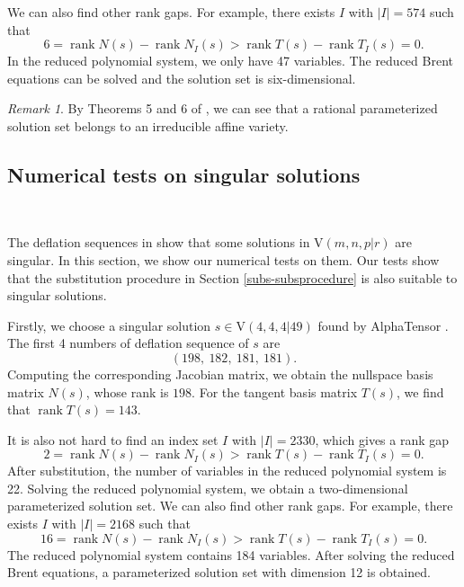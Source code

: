 \documentclass[reqno]{amsart}
\theoremstyle{definition}
\numberwithin{equation}{section}
\theoremstyle{remark}
\newtheorem{remark}[theorem]{Remark}
\begin{document}
We can also find other rank gaps. For example, there exists $I$ with $|I|=574$ such that
\begin{equation*}
 6=\operatorname{rank}N(s)-\operatorname{rank}N_I(s)>\operatorname{rank}T(s)-\operatorname{rank}T_I(s)=0.
\end{equation*}
In the reduced polynomial system, we only have 47 variables. The reduced Brent equations can be solved and the solution set is six-dimensional.

\begin{remark}
By Theorems 5 and 6 of \cite[Chapter 4  \S 5]{cox25}, we can see that a rational parameterized solution set belongs to an irreducible affine variety.
\end{remark}

\subsection{Numerical tests on singular solutions}\label{subs-testsing}
\

The deflation sequences in \cite{li25def} show that some solutions in 
$\mathrm{V}(m,n,p|r)$ are singular. In this section, we show our numerical tests on them. Our tests show that the substitution procedure in Section \ref{subs-subsprocedure} is also suitable to singular solutions.

Firstly, we choose a singular solution $s\in\mathrm{V}(4,4,4|49)$ found by AlphaTensor \cite{Faw22}. The first 4 numbers of deflation sequence of $s$ are $$(198,~182,~181,~181).$$
Computing the corresponding Jacobian matrix, we obtain the nullspace basis matrix $N(s)$, whose rank is $198$. For the tangent basis matrix $T(s)$, we find that $\operatorname{rank}T(s)= 143$.

It is also not hard to find an index set $I$ with $|I|=2330$, which gives a rank gap
\begin{equation*} 
2=\operatorname{rank}N(s)-\operatorname{rank}N_I(s)>
\operatorname{rank}T(s)-\operatorname{rank}T_I(s)=0.
\end{equation*}
After substitution, the number of variables in the reduced polynomial system is 22. Solving the reduced polynomial system, we obtain a two-dimensional parameterized solution set.
We can also find other rank gaps. For example, there exists $I$ with $|I|=2168$ such that
\begin{equation*}
16=\operatorname{rank}N(s)-\operatorname{rank}N_I(s)>
\operatorname{rank}T(s)-\operatorname{rank}T_I(s)=0.
\end{equation*}
The reduced polynomial system contains 184 variables. After solving the reduced Brent equations, a parameterized solution set with dimension 12 is obtained.
\end{document}
